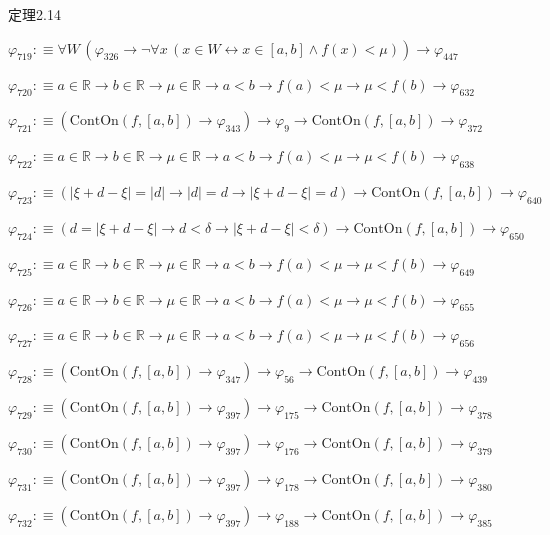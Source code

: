 \begin{fullproof}{定理2.14}
\begin{abbrevlist}
\item $\varphi_{719} :\equiv \forall W\,(\varphi_{326} \to \neg \forall x\,(x \in W \leftrightarrow x \in [a,b] \land f(x) < \mu)) \to \varphi_{447}$
\item $\varphi_{720} :\equiv a \in \mathbb{R} \to b \in \mathbb{R} \to \mu \in \mathbb{R} \to a < b \to f(a) < \mu \to \mu < f(b) \to \varphi_{632}$
\item $\varphi_{721} :\equiv (\mathrm{ContOn}(f,[a,b]) \to \varphi_{343}) \to \varphi_{9} \to \mathrm{ContOn}(f,[a,b]) \to \varphi_{372}$
\item $\varphi_{722} :\equiv a \in \mathbb{R} \to b \in \mathbb{R} \to \mu \in \mathbb{R} \to a < b \to f(a) < \mu \to \mu < f(b) \to \varphi_{638}$
\item $\varphi_{723} :\equiv (\lvert \xi + d - \xi \rvert = \lvert d \rvert \to \lvert d \rvert = d \to \lvert \xi + d - \xi \rvert = d) \to \mathrm{ContOn}(f,[a,b]) \to \varphi_{640}$
\item $\varphi_{724} :\equiv (d = \lvert \xi + d - \xi \rvert \to d < \delta \to \lvert \xi + d - \xi \rvert < \delta) \to \mathrm{ContOn}(f,[a,b]) \to \varphi_{650}$
\item $\varphi_{725} :\equiv a \in \mathbb{R} \to b \in \mathbb{R} \to \mu \in \mathbb{R} \to a < b \to f(a) < \mu \to \mu < f(b) \to \varphi_{649}$
\item $\varphi_{726} :\equiv a \in \mathbb{R} \to b \in \mathbb{R} \to \mu \in \mathbb{R} \to a < b \to f(a) < \mu \to \mu < f(b) \to \varphi_{655}$
\item $\varphi_{727} :\equiv a \in \mathbb{R} \to b \in \mathbb{R} \to \mu \in \mathbb{R} \to a < b \to f(a) < \mu \to \mu < f(b) \to \varphi_{656}$
\item $\varphi_{728} :\equiv (\mathrm{ContOn}(f,[a,b]) \to \varphi_{347}) \to \varphi_{56} \to \mathrm{ContOn}(f,[a,b]) \to \varphi_{439}$
\item $\varphi_{729} :\equiv (\mathrm{ContOn}(f,[a,b]) \to \varphi_{397}) \to \varphi_{175} \to \mathrm{ContOn}(f,[a,b]) \to \varphi_{378}$
\item $\varphi_{730} :\equiv (\mathrm{ContOn}(f,[a,b]) \to \varphi_{397}) \to \varphi_{176} \to \mathrm{ContOn}(f,[a,b]) \to \varphi_{379}$
\item $\varphi_{731} :\equiv (\mathrm{ContOn}(f,[a,b]) \to \varphi_{397}) \to \varphi_{178} \to \mathrm{ContOn}(f,[a,b]) \to \varphi_{380}$
\item $\varphi_{732} :\equiv (\mathrm{ContOn}(f,[a,b]) \to \varphi_{397}) \to \varphi_{188} \to \mathrm{ContOn}(f,[a,b]) \to \varphi_{385}$

\end{abbrevlist}
\end{fullproof}
